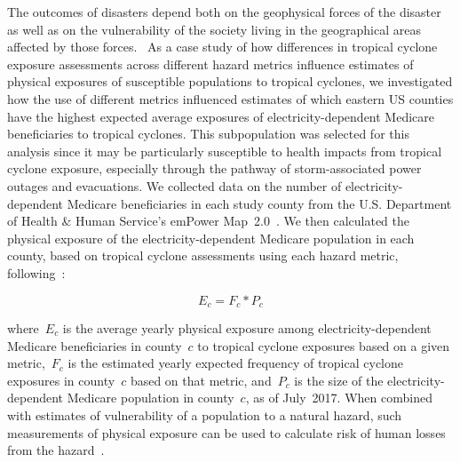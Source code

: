 The outcomes of disasters depend both on the geophysical forces of the disaster
as well as on the vulnerability of the society living in the geographical areas
affected by those forces.~\citep{chakraborty2005population,
anderson2003community, cutter1996vulnerability} As a case study of how
differences in tropical cyclone exposure assessments across different hazard
metrics influence estimates of physical exposures of susceptible populations to
tropical cyclones, we investigated how the use of different metrics influenced
estimates of which eastern \ac{US} counties have the highest expected average
exposures of electricity-dependent Medicare beneficiaries to tropical cyclones.
This subpopulation was selected for this analysis since it may be particularly
susceptible to health impacts from tropical cyclone exposure, especially
through the pathway of storm-associated power outages and evacuations. We
collected data on the number of electricity-dependent Medicare beneficiaries in
each study county from the U.S. Department of Health \& Human Service's emPower
Map~2.0~\citep{empower}. We then calculated the physical exposure of the
electricity-dependent Medicare population in each county, based on tropical
cyclone assessments using each hazard metric,
following~\citep{peduzzi2009assessing}:

\begin{equation}
E_c = F_c * P_c
\end{equation}

\noindent where~$E_c$ is the average yearly physical exposure among
electricity-dependent Medicare beneficiaries in county~$c$ to tropical cyclone
exposures based on a given metric,~$F_c$ is the estimated yearly expected
frequency of tropical cyclone exposures in county~$c$ based on that metric,
and~$P_c$ is the size of the electricity-dependent Medicare population in
county~$c$, as of July~2017. When combined with estimates of vulnerability of a
population to a natural hazard, such measurements of physical exposure can be
used to calculate risk of human losses from the
hazard~\citep{peduzzi2009assessing}.



